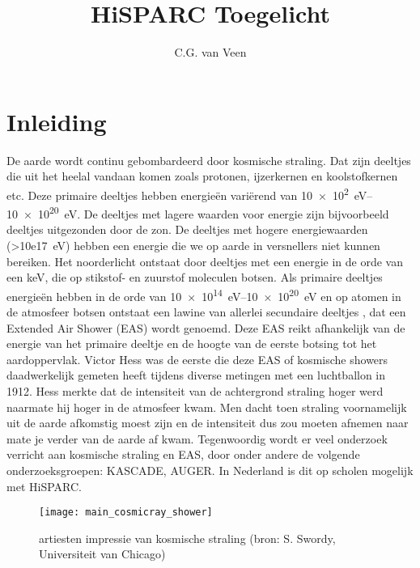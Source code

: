 

\usepackage{lipsum}

\title{HiSPARC Toegelicht} \author{C.G. van Veen} 



\maketitle

\section{Inleiding}

De aarde wordt continu gebombardeerd door kosmische straling. Dat zijn
deeltjes die uit het heelal vandaan komen zoals protonen, ijzerkernen en
koolstofkernen etc. Deze primaire deeltjes hebben energieën variërend
van \SIrange{10e2}{10e20}{\electronvolt}. De deeltjes met lagere
waarden voor energie zijn bijvoorbeeld deeltjes uitgezonden door de zon.
De deeltjes met hogere energiewaarden (\SI{>10e17}{\electronvolt}) hebben
een energie die we op aarde in versnellers niet kunnen bereiken. Het
noorderlicht ontstaat door deeltjes met een energie in de orde van een
keV, die op stikstof- en zuurstof moleculen botsen. Als primaire
deeltjes energieën hebben in de orde van \SIrange{10e14}{10e20}
{\electronvolt} en op atomen in de atmosfeer botsen ontstaat een lawine
van allerlei secundaire deeltjes , dat
een Extended Air Shower (EAS) wordt genoemd. Deze EAS reikt afhankelijk
van de energie van het primaire deeltje en de hoogte van de eerste
botsing tot het aardoppervlak. Victor Hess was de eerste die deze EAS of
kosmische showers daadwerkelijk gemeten heeft tijdens diverse metingen
met een luchtballon in 1912. Hess merkte dat de intensiteit van de
achtergrond straling hoger werd naarmate hij hoger in de atmosfeer kwam.
Men dacht toen straling voornamelijk uit de aarde afkomstig moest zijn
en de intensiteit dus zou moeten afnemen naar mate je verder van de
aarde af kwam. Tegenwoordig wordt er veel onderzoek verricht aan
kosmische straling en EAS, door onder andere de volgende
onderzoeksgroepen: KASCADE, AUGER. In Nederland is dit op scholen
mogelijk met HiSPARC.

\begin{figure} \centering
\texttt{[image: main\_cosmicray\_shower]} \caption{artiesten
impressie van kosmische straling (bron: S. Swordy, Universiteit van
Chicago)} \label{fig:main_cosmicray_shower} \end{figure}

